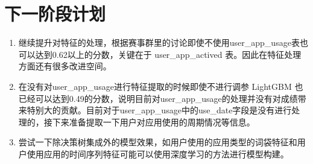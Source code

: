 \documentclass[12pt]{article}
\begin{document}
\section{下一阶段计划}

\begin{enumerate}
    \item 继续提升对特征的处理，根据赛事群里的讨论即使不使用user\_app\_usage表也可以达到0.62以上的分数，关键在于 user\_app\_actived 表。因此在特征处理方面还有很多改进空间。
    \item 在没有对user\_app\_usage进行特征提取的时候即使不进行调参 LightGBM 也已经可以达到0.49的分数，说明目前对user\_app\_usage的处理并没有对成绩带来特别大的贡献。目前对于user\_app\_usage中的use\_date字段是没有进行处理的，接下来准备提取一下用户对应用使用的周期情况等信息。
    \item 尝试一下除决策树集成外的模型效果，如用户使用的应用类型的词袋特征和用户使用应用的时间序列特征可能可以使用深度学习的方法进行模型构建。
\end{enumerate}
\end{document}
